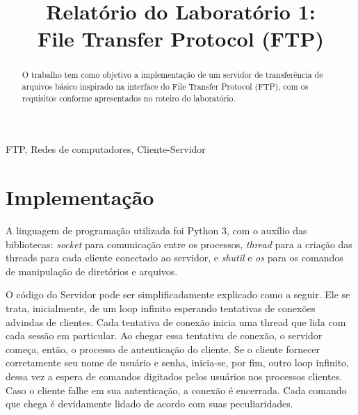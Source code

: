 \documentclass[conference]{IEEEtran}
\begin{document}
\title{Relatório do Laboratório 1: \\ File Transfer Protocol (FTP)\\
}

\author{
}

\maketitle

\begin{abstract}
O trabalho tem como objetivo a implementação de um servidor de transferência de arquivos básico inspirado na interface do File Transfer Protocol (FTP), com os requisitos conforme apresentados no roteiro do laboratório.
\end{abstract}

\begin{IEEEkeywords}
FTP, Redes de computadores, Cliente-Servidor
\end{IEEEkeywords}

\section{Implementação}

A linguagem de programação utilizada foi Python 3, com o auxílio das bibliotecas: \textit{socket} para comunicação entre os processos, \textit{thread} para a criação das threads para cada cliente conectado ao servidor, e \textit{shutil} e \textit{os} para os comandos de manipulação de diretórios e arquivos.

O código do Servidor pode ser simplificadamente explicado como a seguir. Ele se trata, inicialmente, de um loop infinito esperando tentativas de conexões advindas de clientes. Cada tentativa de conexão inicia uma thread que lida com cada sessão em particular. Ao chegar essa tentativa de conexão, o servidor começa, então, o processo de autenticação do cliente. Se o cliente fornecer corretamente seu nome de usuário e senha, inicia-se, por fim, outro loop infinito, dessa vez a espera de comandos digitados pelos usuários nos processos clientes. Caso o cliente falhe em sua antenticação, a conexão é encerrada. Cada comando que chega é devidamente lidado de acordo com suas peculiaridades.
\end{document}
